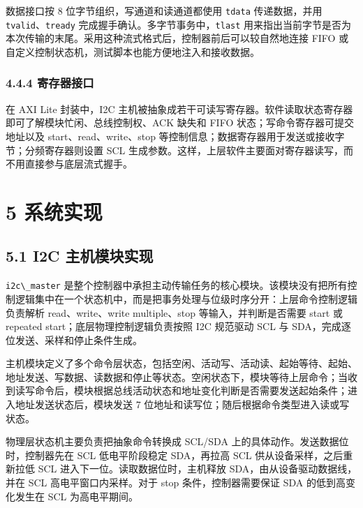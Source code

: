 数据接口按 8 位字节组织，写通道和读通道都使用
\passthrough{\lstinline!tdata!} 传递数据，并用
\passthrough{\lstinline!tvalid!}、\passthrough{\lstinline!tready!}
完成握手确认。多字节事务中，\passthrough{\lstinline!tlast!}
用来指出当前字节是否为本次传输的末尾。采用这种流式格式后，控制器前后可以较自然地连接
FIFO 或自定义控制状态机，测试脚本也能方便地注入和接收数据。

\subsubsection{4.4.4 寄存器接口}\label{ux5bc4ux5b58ux5668ux63a5ux53e3}

在 AXI Lite 封装中，I2C
主机被抽象成若干可读写寄存器。软件读取状态寄存器即可了解模块忙闲、总线控制权、ACK
缺失和 FIFO 状态；写命令寄存器可提交地址以及 start、read、write、stop
等控制信息；数据寄存器用于发送或接收字节；分频寄存器则设置 SCL
生成参数。这样，上层软件主要面对寄存器读写，而不用直接参与底层流式握手。

\section{5 系统实现}\label{ux7cfbux7edfux5b9eux73b0}

\subsection{5.1 I2C
主机模块实现}\label{i2c-ux4e3bux673aux6a21ux5757ux5b9eux73b0}

\passthrough{\lstinline!i2c\_master!}
是整个控制器中承担主动传输任务的核心模块。该模块没有把所有控制逻辑集中在一个状态机中，而是把事务处理与位级时序分开：上层命令控制逻辑负责解析
read、write、write multiple、stop 等输入，并判断是否需要 start 或
repeated start；底层物理控制逻辑负责按照 I2C 规范驱动 SCL 与
SDA，完成逐位发送、采样和停止条件生成。

主机模块定义了多个命令层状态，包括空闲、活动写、活动读、起始等待、起始、地址发送、写数据、读数据和停止等状态。空闲状态下，模块等待上层命令；当收到读写命令后，模块根据总线活动状态和地址变化判断是否需要发送起始条件；进入地址发送状态后，模块发送
7 位地址和读写位；随后根据命令类型进入读或写状态。

物理层状态机主要负责把抽象命令转换成 SCL/SDA
上的具体动作。发送数据位时，控制器先在 SCL 低电平阶段稳定 SDA，再拉高
SCL 供从设备采样，之后重新拉低 SCL 进入下一位。读取数据位时，主机释放
SDA，由从设备驱动数据线，并在 SCL 高电平窗口内采样。对于 stop
条件，控制器需要保证 SDA 的低到高变化发生在 SCL 为高电平期间。

